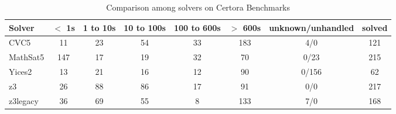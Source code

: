 \begin{table}
  \begin{tabular}{|l|c|c|c|c|c|c|c|}
    \hline
    Solver & $<$ 1s & 1 to 10s & 10 to 100s & 100 to 600s & $>$ 600s & unknown/unhandled & solved \\
    \hline
    CVC5 & 11 & 23 & 54 & 33 & 183 & 4/0 & 121 \\
    \hline
    MathSat5 & 147 & 17 & 19 & 32 & 70 & 0/23 & 215 \\
    \hline
    Yices2 & 13 & 21 & 16 & 12 & 90 & 0/156 & 62 \\
    \hline
    z3 & 26 & 88 & 86 & 17 & 91 & 0/0 & 217 \\
    \hline
    z3legacy & 36 & 69 & 55 & 8 & 133 & 7/0 & 168 \\
    \hline
    \end{tabular}
  \caption{Comparison among solvers on Certora Benchmarks \label{tab:compare-benchmark-submission}}
\end{table}


